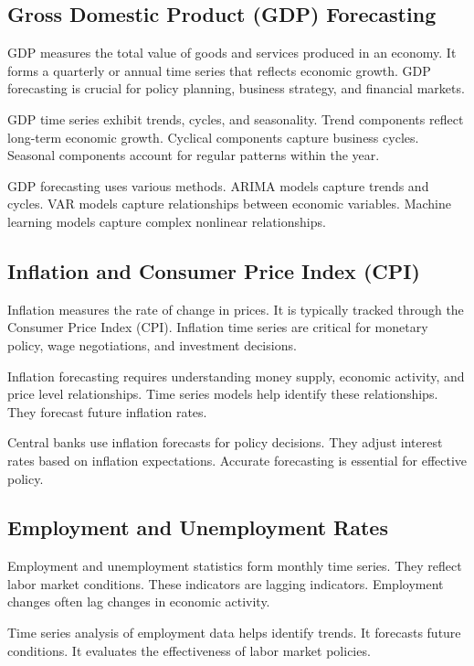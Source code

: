 \subsection{Gross Domestic Product (GDP) Forecasting}

GDP measures the total value of goods and services produced in an economy. It forms a quarterly or annual time series that reflects economic growth. GDP forecasting is crucial for policy planning, business strategy, and financial markets.

GDP time series exhibit trends, cycles, and seasonality. Trend components reflect long-term economic growth. Cyclical components capture business cycles. Seasonal components account for regular patterns within the year.

GDP forecasting uses various methods. ARIMA models capture trends and cycles. VAR models capture relationships between economic variables. Machine learning models capture complex nonlinear relationships.

\subsection{Inflation and Consumer Price Index (CPI)}

Inflation measures the rate of change in prices. It is typically tracked through the Consumer Price Index (CPI). Inflation time series are critical for monetary policy, wage negotiations, and investment decisions.

Inflation forecasting requires understanding money supply, economic activity, and price level relationships. Time series models help identify these relationships. They forecast future inflation rates.

Central banks use inflation forecasts for policy decisions. They adjust interest rates based on inflation expectations. Accurate forecasting is essential for effective policy.

\subsection{Employment and Unemployment Rates}

Employment and unemployment statistics form monthly time series. They reflect labor market conditions. These indicators are lagging indicators. Employment changes often lag changes in economic activity.

Time series analysis of employment data helps identify trends. It forecasts future conditions. It evaluates the effectiveness of labor market policies.

